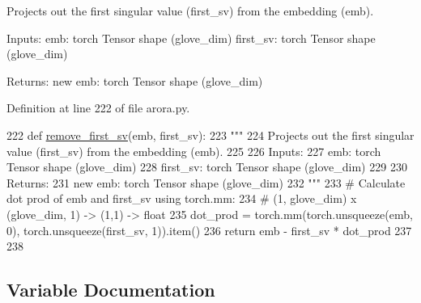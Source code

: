 \begin{DoxyVerb}Projects out the first singular value (first_sv) from the embedding (emb).

Inputs:
  emb: torch Tensor shape (glove_dim)
  first_sv: torch Tensor shape (glove_dim)

Returns:
  new emb: torch Tensor shape (glove_dim)
\end{DoxyVerb}
 

Definition at line 222 of file arora.\+py.


\begin{DoxyCode}
222 \textcolor{keyword}{def }\hyperlink{namespaceprojects_1_1controllable__dialogue_1_1controllable__seq2seq_1_1arora_a09f85328842233be3deb489594521c6f}{remove\_first\_sv}(emb, first\_sv):
223     \textcolor{stringliteral}{"""}
224 \textcolor{stringliteral}{    Projects out the first singular value (first\_sv) from the embedding (emb).}
225 \textcolor{stringliteral}{}
226 \textcolor{stringliteral}{    Inputs:}
227 \textcolor{stringliteral}{      emb: torch Tensor shape (glove\_dim)}
228 \textcolor{stringliteral}{      first\_sv: torch Tensor shape (glove\_dim)}
229 \textcolor{stringliteral}{}
230 \textcolor{stringliteral}{    Returns:}
231 \textcolor{stringliteral}{      new emb: torch Tensor shape (glove\_dim)}
232 \textcolor{stringliteral}{    """}
233     \textcolor{comment}{# Calculate dot prod of emb and first\_sv using torch.mm:}
234     \textcolor{comment}{# (1, glove\_dim) x (glove\_dim, 1) -> (1,1) -> float}
235     dot\_prod = torch.mm(torch.unsqueeze(emb, 0), torch.unsqueeze(first\_sv, 1)).item()
236     \textcolor{keywordflow}{return} emb - first\_sv * dot\_prod
237 
238 
\end{DoxyCode}


\subsection{Variable Documentation}
\mbox{\label{namespaceprojects_1_1controllable__dialogue_1_1controllable__seq2seq_1_1arora_a13b07efaa3e2bffc511e07c6b5bd5522}} 
